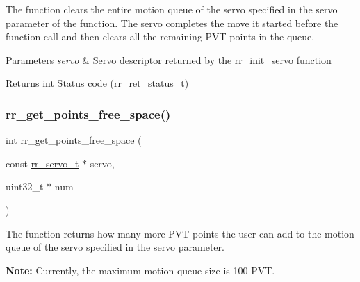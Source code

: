 The function clears the entire motion queue of the servo specified in the \textquotesingle{}servo\textquotesingle{} parameter of the function. The servo completes the move it started before the function call and then clears all the remaining P\+VT points in the queue. 


\begin{DoxyParams}{Parameters}
{\em servo} & Servo descriptor returned by the \hyperlink{group___init_ga0adb313a3eeb8a4399431e940a1f3e9e}{rr\+\_\+init\+\_\+servo} function \\
\hline
\end{DoxyParams}
\begin{DoxyReturn}{Returns}
int Status code (\hyperlink{api_8h_a92d5be5038abcf89837faf85a08debdc}{rr\+\_\+ret\+\_\+status\+\_\+t}) 
\end{DoxyReturn}
\mbox{\label{group___trajectory_gaafd0d575c047ed269664fbc760a640c1}} 
\subsubsection{\texorpdfstring{rr\+\_\+get\+\_\+points\+\_\+free\+\_\+space()}{rr\_get\_points\_free\_space()}}
{\footnotesize\ttfamily int rr\+\_\+get\+\_\+points\+\_\+free\+\_\+space (\begin{DoxyParamCaption}\item[{const \hyperlink{structrr__servo__t}{rr\+\_\+servo\+\_\+t} $\ast$}]{servo,  }\item[{uint32\+\_\+t $\ast$}]{num }\end{DoxyParamCaption})}



The function returns how many more P\+VT points the user can add to the motion queue of the servo specified in the \textquotesingle{}servo\textquotesingle{} parameter. 

{\bfseries Note\+:} Currently, the maximum motion queue size is 100 P\+VT.


